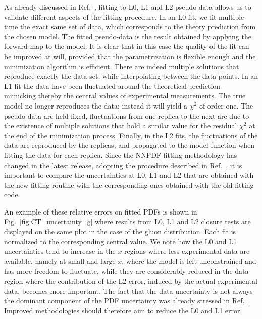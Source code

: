 As already discussed in Ref.~\cite{nnpdf30}, fitting to L0, L1 and L2
pseudo-data allows us to validate different aspects of the fitting procedure. In
an L0 fit, we fit multiple time the exact same set of data, which corresponds to
the theory prediction from the chosen model. The fitted pseudo-data is the
result obtained by applying the forward map to the model. It is clear that in
this case the quality of the fit can be improved at will, provided that the
parametrization is flexible enough and the minimization algorithm is efficient.
There are indeed multiple solutions that reproduce exactly the data set, while
interpolating between the data points. In an L1 fit the data have been
fluctuated around the theoretical prediction -- mimicking thereby the central
values of experimental measurements. The true model no longer reproduces the
data; instead it will yield a $\chi^2$ of order one. The pseudo-data are held
fixed, fluctuations from one replica to the next are due to the existence of
multiple solutions that hold a similar value for the residual $\chi^2$ at the
end of the minimization process. Finally, in the L2 fits, the fluctuations of
the data are reproduced by the replicas, and propagated to the model function
when fitting the data for each replica. Since the NNPDF fitting methodology has
changed in the latest release, adopting the procedure described in
Ref.~\cite{Carrazza:2019mzf}, it is important to compare the uncertainties at
L0, L1 and L2 that are obtained with the new fitting routine with the
corresponding ones obtained with the old fitting code. 

An example of these relative errors on fitted PDFs is shown in
Fig.~\ref{fig:CT_uncertainty_g} where results from L0, L1 and L2 closure tests
are displayed on the same plot in the case of the gluon distribution. Each fit
is normalized to the corresponding central value. We note how the L0 and L1
uncertainties tend to increase in the $x$ regions where less experimental data
are available, namely at small and large-$x$, where the model is left
unconstrained and has more freedom to fluctuate, while they are considerably
reduced in the data region where the contribution of the L2 error, induced by
the actual experimental data, becomes more important. The fact that the data
uncertainty is not always the dominant component of the PDF uncertainty was
already stressed in Ref.~\cite{nnpdf30}. Improved methodologies should therefore
aim to reduce the L0 and L1 error. 

